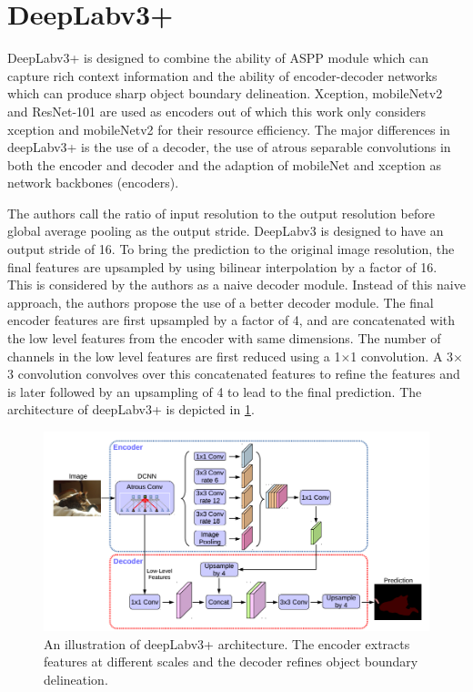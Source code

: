 \section{DeepLabv3+}

DeepLabv3+ is designed to combine the ability of ASPP module which can capture rich context information and the ability of encoder-decoder networks which can produce sharp object boundary delineation. Xception, mobileNetv2 and ResNet-101 are used as encoders out of which this work only considers xception and mobileNetv2 for their resource efficiency. The major differences in deepLabv3+ is the use of a decoder, the use of atrous separable convolutions in both the encoder and decoder and the adaption of mobileNet and xception as network backbones (encoders).

The authors call the ratio of input resolution to the output resolution before global average pooling as the output stride. DeepLabv3 is designed to have an output stride of 16. To bring the prediction to the original image resolution, the final features are upsampled by using bilinear interpolation by a factor of 16. This is considered by the authors as a naive decoder module. Instead of this naive approach, the authors propose the use of a better decoder module. The final encoder features are first upsampled by a factor of 4, and are concatenated with the low level features from the encoder with same dimensions. The number of channels in the low level features are first reduced using a 1$\times$1 convolution. A 3$\times$3 convolution convolves over this concatenated features to refine the features and is later followed by an upsampling of 4 to lead to the final prediction. The architecture of deepLabv3+ is depicted in \ref{Fig:deepLabv4}.

	\begin{figure}[!htb]
		\centering
		\includegraphics[width=1\linewidth]{images/deepLabv4}
		\caption{An illustration of deepLabv3+ architecture. The encoder extracts features at different scales and the decoder refines object boundary delineation.}
		\label{Fig:deepLabv4}
	\end{figure}

